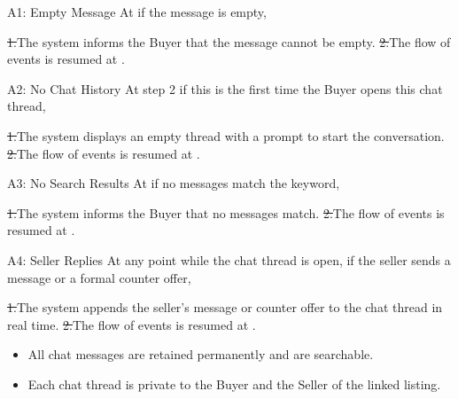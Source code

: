 \begin{flowblock}{A1: Empty Message}
At  if the message is empty,\par
\st{1.}{The system informs the Buyer that the message cannot be empty.}
\st{2.}{The flow of events is resumed at .}
\end{flowblock}
\begin{flowblock}{A2: No Chat History}
At step 2 if this is the first time the Buyer opens this chat thread,\par
\st{1.}{The system displays an empty thread with a prompt to start the conversation.}
\st{2.}{The flow of events is resumed at .}
\end{flowblock}
\begin{flowblock}{A3: No Search Results}
At  if no messages match the keyword,\par
\st{1.}{The system informs the Buyer that no messages match.}
\st{2.}{The flow of events is resumed at .}
\end{flowblock}
\begin{flowblock}{A4: Seller Replies}
At any point while the chat thread is open, if the seller sends a message or a formal counter offer,\par
\st{1.}{The system appends the seller's message or counter offer to the chat thread in real time.}
\st{2.}{The flow of events is resumed at .}
\end{flowblock}
\begin{itemize}
  \item All chat messages are retained permanently and are searchable.
  \item Each chat thread is private to the Buyer and the Seller of the linked listing.
\end{itemize}

